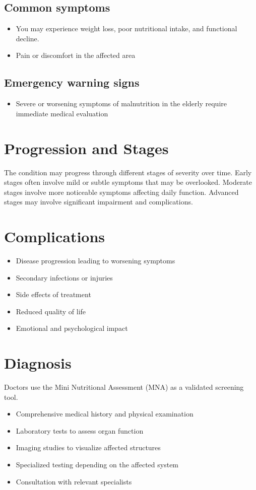 \subsection{Common symptoms}
\begin{itemize}[noitemsep]
  \item You may experience weight loss, poor nutritional intake, and functional decline.
  \item Pain or discomfort in the affected area
  \end{itemize}
\subsection{Emergency warning signs}
\begin{itemize}[noitemsep]
  \item Severe or worsening symptoms of malnutrition in the elderly require immediate medical evaluation
\end{itemize}
\section{Progression and Stages}
The condition may progress through different stages of severity over time. Early stages often involve mild or subtle symptoms that may be overlooked. Moderate stages involve more noticeable symptoms affecting daily function. Advanced stages may involve significant impairment and complications.
\section{Complications}
\begin{itemize}[noitemsep]
  \item Disease progression leading to worsening symptoms
  \item Secondary infections or injuries
  \item Side effects of treatment
  \item Reduced quality of life
  \item Emotional and psychological impact
\end{itemize}
\section{Diagnosis}
Doctors use the Mini Nutritional Assessment (MNA) as a validated screening tool.

\begin{itemize}[noitemsep]
  \item Comprehensive medical history and physical examination
  \item Laboratory tests to assess organ function
  \item Imaging studies to visualize affected structures
  \item Specialized testing depending on the affected system
  \item Consultation with relevant specialists
\end{itemize}
